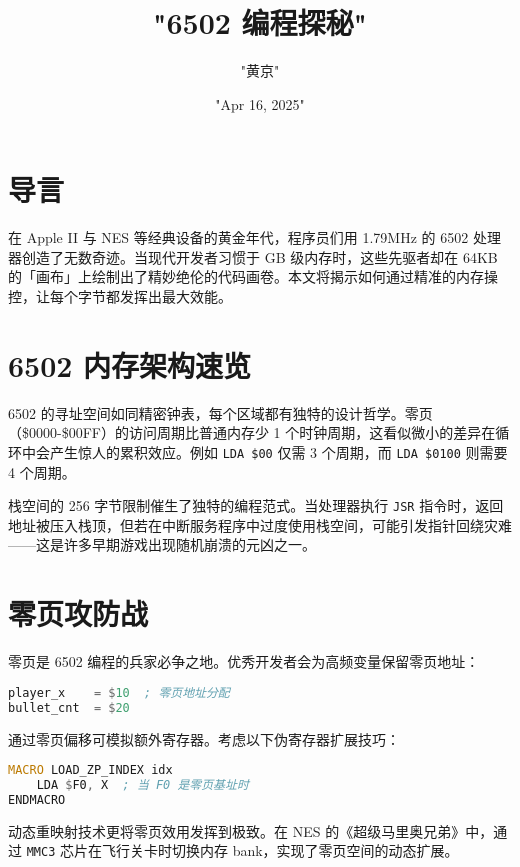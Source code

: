 \title{"6502 编程探秘"}
\author{"黄京"}
\date{"Apr 16, 2025"}
\maketitle
\chapter{导言}
在 Apple II 与 NES 等经典设备的黄金年代，程序员们用 1.79MHz 的 6502 处理器创造了无数奇迹。当现代开发者习惯于 GB 级内存时，这些先驱者却在 64KB 的「画布」上绘制出了精妙绝伦的代码画卷。本文将揭示如何通过精准的内存操控，让每个字节都发挥出最大效能。\par
\chapter{6502 内存架构速览}
6502 的寻址空间如同精密钟表，每个区域都有独特的设计哲学。零页（\${}0000-\${}00FF）的访问周期比普通内存少 1 个时钟周期，这看似微小的差异在循环中会产生惊人的累积效应。例如 \texttt{LDA \${}00} 仅需 3 个周期，而 \texttt{LDA \${}0100} 则需要 4 个周期。\par
栈空间的 256 字节限制催生了独特的编程范式。当处理器执行 \texttt{JSR} 指令时，返回地址被压入栈顶，但若在中断服务程序中过度使用栈空间，可能引发指针回绕灾难——这是许多早期游戏出现随机崩溃的元凶之一。\par
\chapter{零页攻防战}
零页是 6502 编程的兵家必争之地。优秀开发者会为高频变量保留零页地址：\par
\begin{lstlisting}[language=asm]
player_x    = $10  ; 零页地址分配
bullet_cnt  = $20
\end{lstlisting}
通过零页偏移可模拟额外寄存器。考虑以下伪寄存器扩展技巧：\par
\begin{lstlisting}[language=asm]
MACRO LOAD_ZP_INDEX idx
    LDA $F0, X  ; 当 F0 是零页基址时
ENDMACRO
\end{lstlisting}
动态重映射技术更将零页效用发挥到极致。在 NES 的《超级马里奥兄弟》中，通过 \texttt{MMC3} 芯片在飞行关卡时切换内存 bank，实现了零页空间的动态扩展。\par
